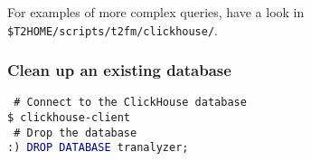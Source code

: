 \documentclass[documentation]{subfiles}
\begin{document}
\noindent
For examples of more complex queries, have a look in {\tt \$T2HOME/scripts/t2fm/clickhouse/}.

\subsubsection{Clean up an existing database}

{\tt\color{blue} \# Connect to the ClickHouse database}\\
{\tt \$ clickhouse-client}\\

\noindent
{\tt\color{blue} \# Drop the database}\\
{\tt :)\ \textcolor{darkblue}{DROP DATABASE} tranalyzer;}\\
\end{document}
